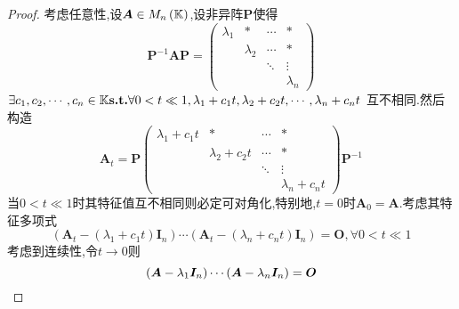 \begin{proof}
    考虑任意性,设$\bm{A}\in M_n\left(\mathbb{K} \right)$,设非异阵$\bm{P}$使得
    \[
        \bm{P}^{-1}\bm{AP}=\begin{pmatrix}
            \lambda_1 & *         & \cdots & *         \\
                      & \lambda_2 & \cdots & *         \\
                      &           & \ddots & \vdots    \\
                      &           &        & \lambda_n
        \end{pmatrix}
    \]$\exists c_1,c_2,\cdots,c_n\in\mathbb{K} \textup{\bfseries{s.t.}}\forall 0<t\ll 1,\lambda_1+c_1t,
        \lambda_2+c_2t,\cdots,\lambda_n+c_nt$
    互不相同.然后构造
    \[
        \bm{A}_t=
        \bm{P}\begin{pmatrix}
            \lambda_1+c_1t & *              & \cdots & *              \\
                           & \lambda_2+c_2t & \cdots & *              \\
                           &                & \ddots & \vdots         \\
                           &                &        & \lambda_n+c_nt
        \end{pmatrix}\bm{P}^{-1}
    \]当$0<t\ll 1$时其特征值互不相同则必定可对角化,特别地,$t=0$时$\bm{A}_0=\bm{A}.$考虑其特征多项式
    \[
        \left(
        \bm{A}_t-\left(\lambda_1+c_1t\right)\bm{I}_n
        \right)\cdots\left(
        \bm{A}_t-\left(\lambda_n+c_nt\right)\bm{I}_n
        \right)=\bm{O},\forall 0<t\ll 1
    \]
    考虑到连续性,令$t\to 0$则
    \[
        \left(
        \bm{A}-\lambda_1\bm{I}_n
        \right)\cdots\left(
        \bm{A}-\lambda_n\bm{I}_n
        \right)=\bm{O}\qedhere
    \]
\end{proof}